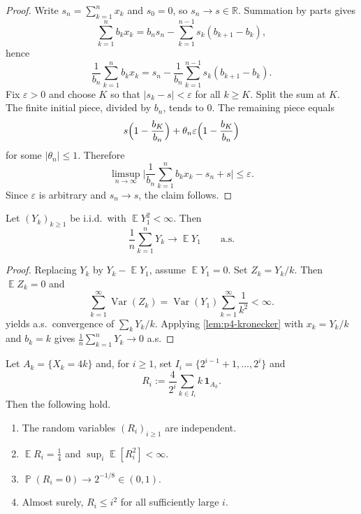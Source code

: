 \documentclass[11pt,a4paper]{article}
\DeclareMathOperator{\Var}{Var}
\DeclareMathOperator{\E}{\mathbb{E}}
\DeclareMathOperator{\Pbb}{\mathbb{P}}
\begin{document}
\begin{proof}
Write \(s_n=\sum_{k=1}^n x_k\) and \(s_0=0\), so \(s_n\to s\in\mathbb{R}\). Summation by parts gives
\[
\sum_{k=1}^n b_k x_k
=
b_n s_n-\sum_{k=1}^{n-1}s_k(b_{k+1}-b_k),
\]
hence
\[
\frac{1}{b_n}\sum_{k=1}^n b_k x_k
=
s_n-\frac{1}{b_n}\sum_{k=1}^{n-1}s_k(b_{k+1}-b_k).
\]
Fix \(\varepsilon>0\) and choose \(K\) so that \(\lvert s_k-s\rvert<\varepsilon\) for all \(k\ge K\). Split the sum at \(K\). The finite initial piece, divided by \(b_n\), tends to \(0\). The remaining piece equals
\[
s\Bigl(1-\frac{b_K}{b_n}\Bigr)
+
\theta_n\varepsilon\Bigl(1-\frac{b_K}{b_n}\Bigr)
\]
for some \(\lvert\theta_n\rvert\le 1\). Therefore
\[
\limsup_{n\to\infty}\Biggl\lvert\frac{1}{b_n}\sum_{k=1}^n b_k x_k-s_n+s\Biggr\rvert
\le\varepsilon.
\]
Since \(\varepsilon\) is arbitrary and \(s_n\to s\), the claim follows.
\end{proof}

\begin{lemma}
\label{lem:p4-slln}
Let \((Y_k)_{k\ge 1}\) be i.i.d.\ with \(\E Y_1^2<\infty\). Then
\[
\frac{1}{n}\sum_{k=1}^n Y_k\to\E Y_1
\qquad\text{a.s.}
\]
\end{lemma}

\begin{proof}
Replacing \(Y_k\) by \(Y_k-\E Y_1\), assume \(\E Y_1=0\). Set \(Z_k=Y_k/k\). Then \(\E Z_k=0\) and
\[
\sum_{k=1}^\infty\Var(Z_k)
=
\Var(Y_1)\sum_{k=1}^\infty\frac{1}{k^2}<\infty.
\]
 yields a.s.\ convergence of \(\sum_k Y_k/k\). Applying \cref{lem:p4-kronecker} with \(x_k=Y_k/k\) and \(b_k=k\) gives \(\frac1n\sum_{k=1}^n Y_k\to 0\) a.s.
\end{proof}

\begin{lemma}
\label{lem:p4-blocks}
Let \(A_k=\{X_k=4k\}\) and, for \(i\ge 1\), set \(I_i=\{2^{i-1}+1,\dots,2^i\}\) and
\[
R_i
:=
\frac{4}{2^i}\sum_{k\in I_i}k\,\mathbf{1}_{A_k}.
\]
Then the following hold.
\begin{enumerate}[label=(\roman*)]
    \item The random variables \((R_i)_{i\ge 1}\) are independent.
    \item \(\E R_i=\frac14\) and \(\sup_i\E[R_i^2]<\infty\).
    \item \(\Pbb(R_i=0)\to 2^{-1/8}\in(0,1)\).
    \item Almost surely, \(R_i\le i^2\) for all sufficiently large \(i\).
\end{enumerate}
\end{lemma}
\end{document}
